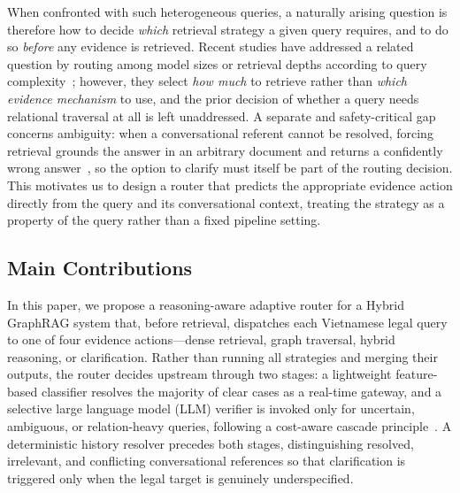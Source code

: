 \documentclass[pdflatex,sn-mathphys-num]{sn-jnl}
\begin{document}
When confronted with such heterogeneous queries, a naturally arising question
is therefore how to decide \emph{which} retrieval strategy a given query
requires, and to do so \emph{before} any evidence is retrieved. Recent studies
have addressed a related question by routing among model sizes or retrieval
depths according to query complexity~\cite{jeong2024adaptive,chen2023frugalgpt,ong2024routellm};
however, they select \emph{how much} to retrieve rather than \emph{which
evidence mechanism} to use, and the prior decision of whether a query needs
relational traversal at all is left unaddressed. A separate and
safety-critical gap concerns ambiguity: when a conversational referent cannot
be resolved, forcing retrieval grounds the answer in an arbitrary document and
returns a confidently wrong answer~\cite{min2020ambigqa,elgohary2019canard},
so the option to clarify must itself be part of the routing decision. This
motivates us to design a router that predicts the appropriate evidence action
directly from the query and its conversational context, treating the strategy
as a property of the query rather than a fixed pipeline setting.

\subsection{Main Contributions}\label{subsec:contributions}

In this paper, we propose a reasoning-aware adaptive router for a Hybrid
GraphRAG system that, before retrieval, dispatches each Vietnamese legal query
to one of four evidence actions---dense retrieval, graph traversal, hybrid
reasoning, or clarification. Rather than running all strategies and merging
their outputs, the router decides upstream through two stages: a lightweight
feature-based classifier resolves the majority of clear cases as a real-time
gateway, and a selective large language model (LLM) verifier is invoked only
for uncertain, ambiguous, or relation-heavy queries, following a cost-aware
cascade principle~\cite{chen2023frugalgpt,ong2024routellm}. A deterministic
history resolver precedes both stages, distinguishing resolved, irrelevant,
and conflicting conversational references so that clarification is triggered
only when the legal target is genuinely underspecified.
\end{document}
